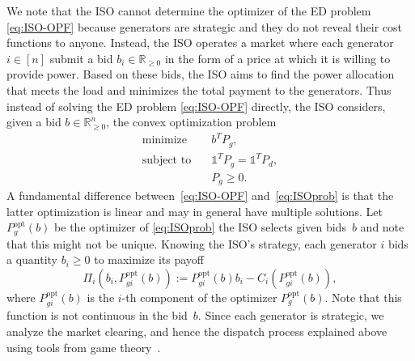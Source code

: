 \documentclass[journal]{IEEEtran}
\newcommand{\1}{\mathds 1}
\newcommand{\realnonnegative}{{\mathbb{R}}_{\ge 0}}
\newcommand{\until}[1]{[#1]}
\newcommand{\st}{\operatorname{subject \text{$\, \,$} to}}
\newcommand{\minimize}{\operatorname{minimize}}
\newcommand{\optimizer}[1][b]{P_{g}^{\text{opt}}(#1)}
\theoremstyle{remark}
\theoremstyle{definition}
\newcommand{\margints}[1]{\marginpar{\color{blue}\tiny\ttfamily#1}}
\begin{document}
We note that the ISO cannot determine the optimizer of the ED problem
\eqref{eq:ISO-OPF} because generators are strategic and they do not
reveal their cost functions to anyone. Instead, the ISO operates a
market where each generator $i\in\until{n}$ submit a bid $b_i \in
\realnonnegative$ in the form of a price at which it is willing to
provide power.  Based on these bids, the ISO aims to find the power
allocation that meets the load and minimizes the total payment to the
generators.  Thus instead of solving the ED problem \eqref{eq:ISO-OPF}
directly, the ISO considers, given a bid $b \in \realnonnegative^n$,
the convex optimization problem
%
%
\begin{subequations}\label{eq:ISOprob}
  \begin{align}
    \minimize & \quad b^TP_g, \label{eq:ISOobj-fun} 
    \\
    \st & \quad \1^TP_g=\1^TP_d, \label{eq:pow-bal-con}
    \\
    & \quad P_g \ge 0.
  \end{align}
\end{subequations}
%
A fundamental difference between~\eqref{eq:ISO-OPF}
and~\eqref{eq:ISOprob} is that the latter optimization is linear and
may in general have multiple solutions.  Let $\optimizer$ be the
optimizer of \eqref{eq:ISOprob} the ISO selects given bids~$b$ and
note that this might not be unique. Knowing the ISO's strategy,
%
% 
each generator $i$ bids a quantity $b_i\geq0$ to maximize its payoff
\begin{equation}\label{eq:payoffgen}
  \Pi_i(b_i,P_{gi}^{\text{opt}}(b)):=
  P_{gi}^{\text{opt}}(b)b_i-C_i(P_{gi}^{\text{opt}}(b)),
\end{equation}
where $P_{gi}^{\text{opt}}(b)$ is the $i$-th component of the
optimizer $P_g^{\text{opt}}(b)$.  Note that this function is not
continuous in the bid~$b$.  Since each generator is strategic, we
analyze the market clearing, and hence the dispatch process explained
above using tools from game theory~\cite{TB-GJO:82,DF-JT:91}.
\end{document}
